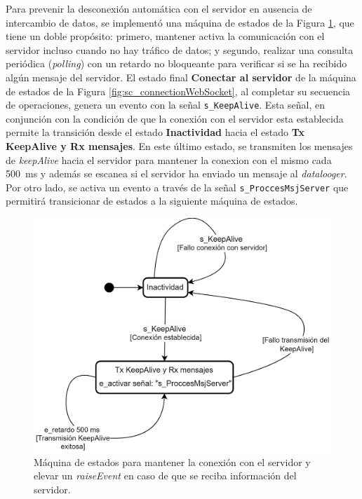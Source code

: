 Para prevenir la desconexión automática con el servidor en ausencia de intercambio de datos, se implementó una máquina de estados de la Figura \ref{fig:sc_keepAlive}, que tiene un doble propósito: primero, mantener activa la comunicación con el servidor incluso cuando no hay tráfico de datos; y segundo, realizar una consulta periódica (\textit{polling}) con un retardo no bloqueante para verificar si se ha recibido algún mensaje del servidor. El estado final \textbf{Conectar al servidor} de la máquina de estados de la Figura \ref{fig:sc_connectionWebSocket}, al completar su secuencia de operaciones, genera un evento con la señal \texttt{s\_KeepAlive}. Esta señal, en conjunción con la condición de que la conexión con el servidor esta establecida permite la transición desde el estado \textbf{Inactividad} hacia el estado \textbf{Tx KeepAlive y Rx mensajes}. En este último estado, se transmiten los mensajes de \textit{keepAlive} hacia el servidor para mantener la conexion con el mismo cada \SI{500}{\milli\second} y además se escanea si el servidor ha enviado un mensaje al \textit{datalooger}. Por otro lado, se activa un evento a través de la señal \texttt{s\_ProccesMsjServer} que permitirá transicionar de estados a la siguiente máquina de estados.




\begin{figure}[H]
    \centering
    \includegraphics[width=0.75\linewidth]{Figuras/datalogger/Firmware/sc_keepAlive.png}
    \caption{Máquina de estados para mantener la conexión con el servidor y elevar un \textit{raiseEvent} en caso de que se reciba información del servidor.}
    \label{fig:sc_keepAlive}
\end{figure}

